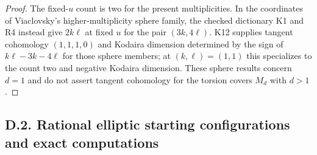 \begin{proof}
The fixed-$u$ count is two for the present multiplicities. In the
coordinates of Viaclovsky's higher-multiplicity sphere family,
the checked dictionary K1 and R4 instead give $2k\ell$ at fixed
$u$ for the pair $(3k,4\ell)$. K12 supplies tangent cohomology
$(1,1,1,0)$ and Kodaira dimension determined by the sign of
$k\ell-3k-4\ell$ for those sphere members; at $(k,\ell)=(1,1)$
this specializes to the count two and negative Kodaira dimension.
These sphere results concern $d=1$ and do not assert tangent
cohomology for the torsion covers $M_d$ with $d>1$.
\end{proof}

\subsection{D.2. Rational elliptic starting configurations and exact computations}
